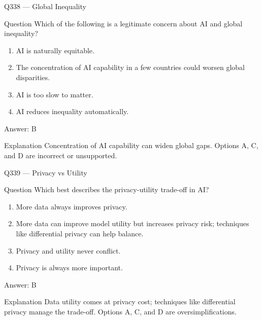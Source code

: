 \documentclass[aspectratio=169,8pt]{beamer}
\begin{document}
\begin{frame}{Q338 --- Global Inequality}
	\begin{block}{Question}
		Which of the following is a legitimate concern about AI and global inequality?
		\begin{enumerate}
			\item AI is naturally equitable.
			\item The concentration of AI capability in a few countries could worsen global disparities.
			\item AI is too slow to matter.
			\item AI reduces inequality automatically.
	\end{enumerate}  \end{block}
	\begin{exampleblock}{Answer: B}\end{exampleblock}
	\begin{block}{Explanation}
		Concentration of AI capability can widen global gaps. Options A, C, and D are incorrect or unsupported.
	\end{block}
\end{frame}

\begin{frame}{Q339 --- Privacy vs Utility}
	\begin{block}{Question}
		Which best describes the privacy-utility trade-off in AI?
		\begin{enumerate}
			\item More data always improves privacy.
			\item More data can improve model utility but increases privacy risk; techniques like differential privacy can help balance.
			\item Privacy and utility never conflict.
			\item Privacy is always more important.
	\end{enumerate}  \end{block}
	\begin{exampleblock}{Answer: B}\end{exampleblock}
	\begin{block}{Explanation}
		Data utility comes at privacy cost; techniques like differential privacy manage the trade-off. Options A, C, and D are oversimplifications.
	\end{block}
\end{frame}
\end{document}
